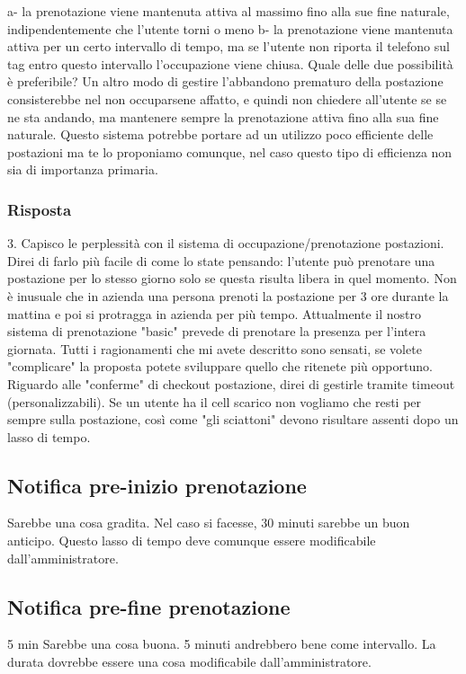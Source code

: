 a- la prenotazione viene mantenuta attiva al massimo fino alla sue fine naturale, indipendentemente che l'utente torni o meno
b- la prenotazione viene mantenuta attiva per un certo intervallo di tempo, ma se l'utente non riporta il telefono sul tag entro questo intervallo l'occupazione viene chiusa.
Quale delle due possibilità è preferibile?
Un altro modo di gestire l'abbandono prematuro della postazione consisterebbe nel non occuparsene affatto, e quindi non chiedere all'utente se se ne sta andando, ma mantenere sempre la prenotazione attiva fino alla sua fine naturale. Questo sistema potrebbe portare ad un utilizzo poco efficiente delle postazioni ma te lo proponiamo comunque, nel caso questo tipo di efficienza non sia di importanza primaria.
\subsubsection*{Risposta}
3. Capisco le perplessità con il sistema di occupazione/prenotazione postazioni. Direi di farlo più facile di come lo state pensando: l'utente può prenotare una postazione per lo stesso giorno solo se questa risulta libera in quel momento. Non è inusuale che in azienda una persona prenoti la postazione per 3 ore durante la mattina e poi si protragga in azienda per più tempo. Attualmente il nostro sistema di prenotazione "basic" prevede di prenotare la presenza per l'intera giornata. Tutti i ragionamenti che mi avete descritto sono sensati, se volete "complicare" la proposta potete sviluppare quello che ritenete più opportuno. Riguardo alle "conferme" di checkout postazione, direi di gestirle tramite timeout (personalizzabili). Se un utente ha il cell scarico non vogliamo che resti per sempre sulla postazione, così come "gli sciattoni" devono risultare assenti dopo un lasso di tempo.

\subsection*{Notifica pre-inizio prenotazione}
Sarebbe una cosa gradita. Nel caso si facesse, 30 minuti sarebbe un buon anticipo. \newline
Questo lasso di tempo deve comunque essere modificabile dall'amministratore.

\subsection*{Notifica pre-fine prenotazione}
5 min
Sarebbe una cosa buona. 5 minuti andrebbero bene come intervallo. La durata dovrebbe essere una cosa modificabile dall'amministratore.

